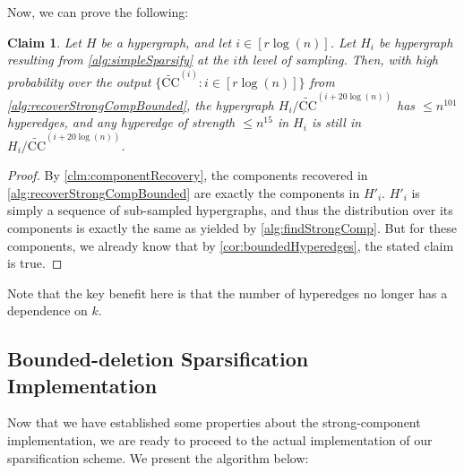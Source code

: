 \documentclass[11pt]{article}
\newtheorem{claim}[theorem]{Claim}
\theoremstyle{definition}
\begin{document}
Now, we can prove the following:

\begin{claim}\label{clm:boundedHyperedgesBoundedDeletion}
	Let $H$ be a hypergraph, and let $i \in [r \log(n)]$. Let $H_i$ be hypergraph resulting from \cref{alg:simpleSparsify} at the $i$th level of sampling. Then, with high probability over the output $\{\widetilde{\mathrm{CC}}^{(i)}: i \in [r \log(n)]\}$ from \cref{alg:recoverStrongCompBounded}, the hypergraph $H_i /  \widetilde{\mathrm{CC}}^{(i + 20 \log(n))}$ has $\leq n^{101}$ hyperedges, and any hyperedge of strength $\leq n^{15}$ in $H_i$ is still in $H_i /  \widetilde{\mathrm{CC}}^{(i + 20 \log(n))}$.
\end{claim}

\begin{proof}
	By \cref{clm:componentRecovery}, the components recovered in \cref{alg:recoverStrongCompBounded} are exactly the components in $H'_i$. $H'_i$ is simply a sequence of sub-sampled hypergraphs, and thus the distribution over its components is exactly the same as yielded by \cref{alg:findStrongComp}. But for these components, we already know that by \cref{cor:boundedHyperedges}, the stated claim is true.
\end{proof}

Note that the key benefit here is that the number of hyperedges no longer has a dependence on $k$.

\subsection{Bounded-deletion Sparsification Implementation}

Now that we have established some properties about the strong-component implementation, we are ready to proceed to the actual implementation of our sparsification scheme. We present the algorithm below:
\end{document}
